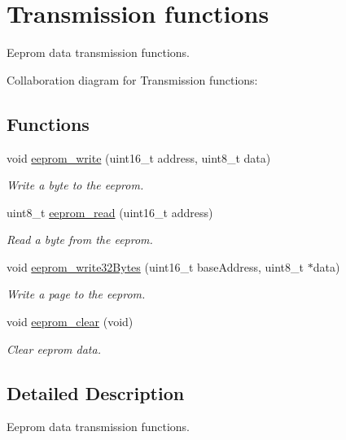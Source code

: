 \hypertarget{group___eeprom___trans}{}\section{Transmission functions}
\label{group___eeprom___trans}


Eeprom data transmission functions.  


Collaboration diagram for Transmission functions\+:
\subsection*{Functions}
\begin{DoxyCompactItemize}
\item 
void \hyperlink{group___eeprom___trans_ga11e27abf76759a5907ef18d1351aecdb}{eeprom\+\_\+write} (uint16\+\_\+t address, uint8\+\_\+t data)
\begin{DoxyCompactList}\small\item\em Write a byte to the eeprom. \end{DoxyCompactList}\item 
uint8\+\_\+t \hyperlink{group___eeprom___trans_gafaa7cca6f6ad1d9ae49522324c825c2f}{eeprom\+\_\+read} (uint16\+\_\+t address)
\begin{DoxyCompactList}\small\item\em Read a byte from the eeprom. \end{DoxyCompactList}\item 
void \hyperlink{group___eeprom___trans_ga4f1a1c3f7642565b9dbff6bfd2e7ed0d}{eeprom\+\_\+write32\+Bytes} (uint16\+\_\+t base\+Address, uint8\+\_\+t $\ast$data)
\begin{DoxyCompactList}\small\item\em Write a page to the eeprom. \end{DoxyCompactList}\item 
void \hyperlink{group___eeprom___trans_ga7964a5a66da1c4a59a42309a93752217}{eeprom\+\_\+clear} (void)
\begin{DoxyCompactList}\small\item\em Clear eeprom data. \end{DoxyCompactList}\end{DoxyCompactItemize}


\subsection{Detailed Description}
Eeprom data transmission functions. 



